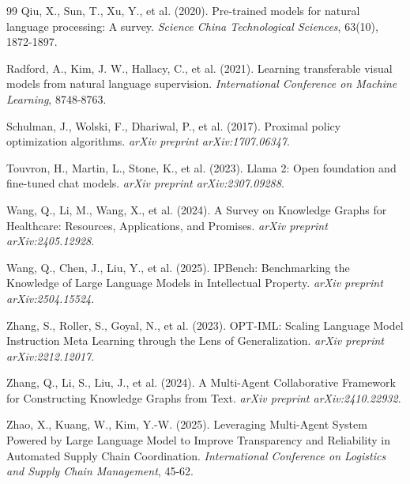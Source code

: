 \documentclass[11pt,a4paper]{article}
\begin{document}
\begin{thebibliography}{99}
Qiu, X., Sun, T., Xu, Y., et al. (2020). 
Pre-trained models for natural language processing: A survey. 
\textit{Science China Technological Sciences}, 63(10), 1872-1897.

Radford, A., Kim, J. W., Hallacy, C., et al. (2021). 
Learning transferable visual models from natural language supervision. 
\textit{International Conference on Machine Learning}, 8748-8763.

Schulman, J., Wolski, F., Dhariwal, P., et al. (2017). 
Proximal policy optimization algorithms. 
\textit{arXiv preprint arXiv:1707.06347}.

Touvron, H., Martin, L., Stone, K., et al. (2023). 
Llama 2: Open foundation and fine-tuned chat models. 
\textit{arXiv preprint arXiv:2307.09288}.

Wang, Q., Li, M., Wang, X., et al. (2024). 
A Survey on Knowledge Graphs for Healthcare: Resources, Applications, and Promises. 
\textit{arXiv preprint arXiv:2405.12928}.

Wang, Q., Chen, J., Liu, Y., et al. (2025). 
IPBench: Benchmarking the Knowledge of Large Language Models in Intellectual Property. 
\textit{arXiv preprint arXiv:2504.15524}.

Zhang, S., Roller, S., Goyal, N., et al. (2023). 
OPT-IML: Scaling Language Model Instruction Meta Learning through the Lens of Generalization. 
\textit{arXiv preprint arXiv:2212.12017}.

Zhang, Q., Li, S., Liu, J., et al. (2024). 
A Multi-Agent Collaborative Framework for Constructing Knowledge Graphs from Text. 
\textit{arXiv preprint arXiv:2410.22932}.

Zhao, X., Kuang, W., Kim, Y.-W. (2025). 
Leveraging Multi-Agent System Powered by Large Language Model to Improve Transparency and Reliability in Automated Supply Chain Coordination. 
\textit{International Conference on Logistics and Supply Chain Management}, 45-62.

\end{thebibliography}
\end{document}

